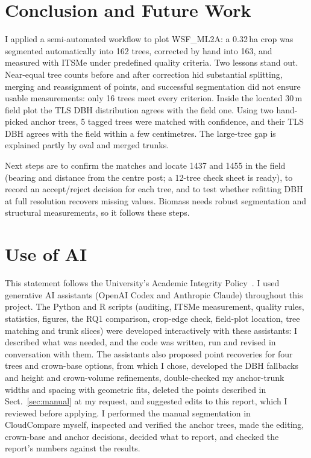 \documentclass[runningheads]{llncs}
\begin{document}
\section{Conclusion and Future Work}\label{sec:conclusion}
I applied a semi-automated workflow to plot WSF\_ML2A: a 0.32\,ha crop was segmented automatically into 162 trees, corrected by hand into 163, and measured with ITSMe under predefined quality criteria. Two lessons stand out. Near-equal tree counts before and after correction hid substantial splitting, merging and reassignment of points, and successful segmentation did not ensure usable measurements: only 16 trees meet every criterion. Inside the located 30\,m field plot the TLS DBH distribution agrees with the field one. Using two hand-picked anchor trees, 5 tagged trees were matched with confidence, and their TLS DBH agrees with the field within a few centimetres. The large-tree gap is explained partly by oval and merged trunks.

Next steps are to confirm the matches and locate 1437 and 1455 in the field (bearing and distance from the centre post; a 12-tree check sheet is ready), to record an accept/reject decision for each tree, and to test whether refitting DBH at full resolution recovers missing values. Biomass needs robust segmentation and structural measurements, so it follows these steps.

\section*{Use of AI}
This statement follows the University's Academic Integrity Policy~\cite{info6003}. I used generative AI assistants (OpenAI Codex and Anthropic Claude) throughout this project. The Python and R scripts (auditing, ITSMe measurement, quality rules, statistics, figures, the RQ1 comparison, crop-edge check, field-plot location, tree matching and trunk slices) were developed interactively with these assistants: I described what was needed, and the code was written, run and revised in conversation with them. The assistants also proposed point recoveries for four trees and crown-base options, from which I chose, developed the DBH fallbacks and height and crown-volume refinements, double-checked my anchor-trunk widths and spacing with geometric fits, deleted the points described in Sect.~\ref{sec:manual} at my request, and suggested edits to this report, which I reviewed before applying. I performed the manual segmentation in CloudCompare myself, inspected and verified the anchor trees, made the editing, crown-base and anchor decisions, decided what to report, and checked the report's numbers against the results.
\end{document}
